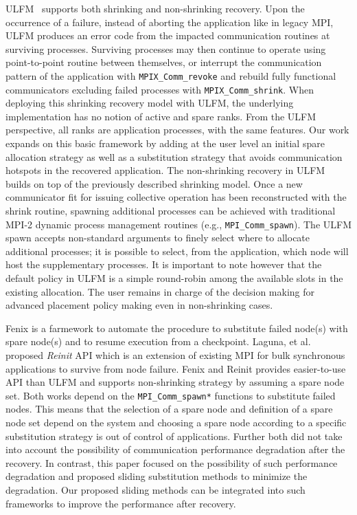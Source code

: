 \documentclass[Afour,times,sageh]{sagej}
\begin{document}
ULFM~\cite{Bland01082013} supports both shrinking and
non-shrinking recovery. Upon the occurrence of a failure, instead of
aborting the application 
like in legacy MPI, ULFM produces an error code from the impacted
communication routines at surviving processes.  
Surviving processes may then continue to operate using point-to-point
routine between themselves, or interrupt the communication pattern of
the application with \texttt{MPIX\_Comm\_revoke} and rebuild fully
functional communicators excluding failed processes with
\texttt{MPIX\_Comm\_shrink}. When deploying this shrinking recovery
model with ULFM, the underlying implementation has no notion of
active and spare ranks.  From the ULFM perspective, all ranks are
application processes, with the same features. Our work expands on
this basic framework by adding at the user level an initial spare
allocation strategy as well as a substitution strategy that avoids
communication hotspots in the recovered application. The
non-shrinking recovery in ULFM builds on top of the previously
described shrinking model. Once a new communicator fit for issuing
collective operation has been reconstructed with the shrink routine,
spawning additional processes can be achieved with traditional MPI-2
dynamic process management routines (e.g.,
\texttt{MPI\_Comm\_spawn}). The ULFM spawn accepts non-standard
arguments to finely select where to allocate additional processes;
it is possible to select, from the application, which node will host
the supplementary processes. It is important to note however that
the default policy in ULFM is a simple round-robin among the
available slots in the existing allocation. The user remains in
charge of the decision making for advanced placement policy making
even in non-shrinking cases. 

Fenix\cite{Gamell:2014:EAO:2683593.2683691} is a farmework to
automate the procedure to substitute  
failed node(s) with spare node(s) and to resume 
execution from a checkpoint. 
Laguna, et al. proposed {\em Reinit} API which is an extension of
existing MPI for bulk synchronous applications to survive from node
failure\cite{osti_1186781}. Fenix and Reinit provides easier-to-use API than ULFM and
supports non-shrinking strategy by assuming a spare node set. 
Both works depend on the \texttt{MPI\_Comm\_spawn*}
functions to substitute failed nodes. This means that the selection
of a spare node and definition of a spare node set depend on the
system and choosing a spare node according to a specific substitution 
strategy is out of control of applications. Further both did not
take into account the possibility of communication performance
degradation after the recovery. In contrast, this paper focused on
the possibility of such performance degradation and proposed sliding 
substitution methods to minimize the degradation. Our proposed
sliding methods can be integrated into such frameworks to improve
the performance after recovery.
\end{document}
